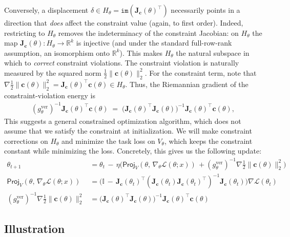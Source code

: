Conversely, a displacement $\delta\in H_\theta=\texttt{im}(\mathbf{J}_{\mathbf c}(\theta)^\top)$ necessarily points in a direction that \emph{does} affect the constraint value (again, to first order).
Indeed, restricting to $H_\theta$ removes the indeterminacy of the constraint Jacobian: on $H_\theta$ the map
\(
\mathbf{J}_{\mathbf c}(\theta):H_\theta\to\mathbb{R}^k
\)
is injective (and under the standard full-row-rank assumption, an isomorphism onto $\mathbb{R}^k$).
This makes $H_\theta$ the natural subspace in which to \emph{ correct} constraint violations. The constraint violation is naturally measured by the squared norm $\tfrac12\|\mathbf c(\theta)\|_2^2$.  For the constraint term, note that $\nabla \tfrac12\|\mathbf c(\theta)\|_2^2 = \mathbf{J}_{\mathbf c}(\theta)^\top \mathbf c(\theta)\in H_\theta$. Thus, the Riemannian gradient of the constraint-violation energy is
\begin{align}
\label{eq:riem_grad_constraint}
(g^{\mathrm{ver}}_\theta)^{-1}\mathbf{J}_{\mathbf c}(\theta)^\top \mathbf c(\theta)
\;=\;
\big(\mathbf{J}_{\mathbf c}(\theta)^\top \mathbf{J}_{\mathbf c}(\theta)\big)^{-1}\mathbf{J}_{\mathbf c}(\theta)^\top \mathbf c(\theta),
\end{align}
This suggests a general constrained optimization algorithm, which does not assume that we satisfy the constraint at initialization. We will make constraint corrections on $H_\theta$ and minimize the task loss on $V_\theta$, which keeps the constraint constant while minimizing the loss. Concretely, this gives us the following update:
\begin{align}
\label{eq:null_space_geom}
    \theta_{t+1} &= \theta_{t} \, - \, \eta \big( \textsf{Proj}_V(\theta, \,\nabla_\theta \mathcal{L}(\theta ; x)) \, +  (g^{\mathrm{ver}}_\theta)^{-1} \nabla \tfrac12\|\mathbf c(\theta)\|_2^2 \big) \\
     \textsf{Proj}_V(\theta, \,\nabla_\theta \mathcal{L}(\theta ; x)) &= \big( \mathbb{I} \, - \, \mathbf{J_{c}}(\theta_t)^{\top}(\mathbf{J_{c}}(\theta_t) \mathbf{J_{c}}(\theta_t)^{\top})^{-1}\mathbf{J_{c}}(\theta_t) \big) \nabla\mathcal{L}(\theta_{t}) \\
     (g^{\mathrm{ver}}_\theta)^{-1} \nabla \tfrac12\|\mathbf c(\theta)\|_2^2 &=  \big(\mathbf{J}_{\mathbf c}(\theta)^\top \mathbf{J}_{\mathbf c}(\theta)\big)^{-1}\mathbf{J}_{\mathbf c}(\theta)^\top \mathbf c(\theta)
\end{align}


\subsection{Illustration}
\label{sec:constr_geometry_tikz}

